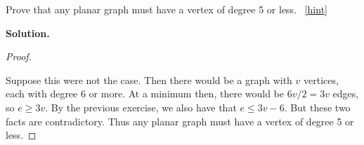 \documentclass{book}
\begin{document}
\setcounter{project}{31}
\addtocounter{project}{-1}
\begin{activity}[]\label{act-planardeg5}
\hypertarget{p-314}{}%
Prove that any planar graph must have a vertex of degree 5 or less.%
~\hfill{\tiny\hyperlink{a-31}{[hint]}\hypertarget{q-31}{}}\par\smallskip%
\noindent\textbf{Solution.}\hypertarget{solution-26}{}\quad%
\begin{proof}\hypertarget{proof-4}{}
\hypertarget{p-316}{}%
Suppose this were not the case. Then there would be a graph with \(v\) vertices, each with degree 6 or more. At a minimum then, there would be \(6v/2 = 3v\) edges, so \(e \ge 3v\). By the previous exercise, we also have that \(e \le 3v - 6\). But these two facts are contradictory. Thus any planar graph must have a vertex of degree 5 or less.%
\end{proof}
\end{activity}
\end{document}
